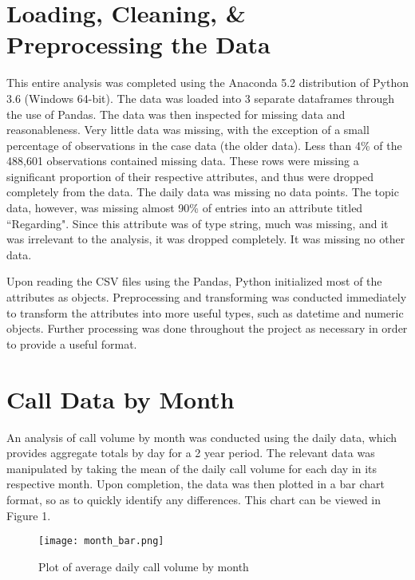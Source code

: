 \documentclass[11pt,twocolumn]{article}
\begin{document}
\section{Loading, Cleaning, \& Preprocessing the Data}
This entire analysis was completed using the Anaconda 5.2 distribution of Python 3.6 (Windows 64-bit).  The data was loaded into 3 separate dataframes through the use of Pandas.  The data was then inspected for missing data and reasonableness.  Very little data was missing, with the exception of a small percentage of observations in the case data (the older data).  Less than 4\% of the 488,601 observations contained missing data.  These rows were missing a significant proportion of their respective attributes, and thus were dropped completely from the data.  The daily data was missing no data points.  The topic data, however, was missing almost 90\% of entries into an attribute titled ``Regarding".  Since this attribute was of type string, much was missing, and it was irrelevant to the analysis, it was dropped completely.  It was missing no other data.
\par
Upon reading the CSV files using the Pandas, Python initialized most of the attributes as objects.  Preprocessing and transforming was conducted immediately to transform the attributes into more useful types, such as datetime and numeric objects.  Further processing was done throughout the project as necessary in order to provide a useful format.

\section{Call Data by Month}
An analysis of call volume by month was conducted using the daily data, which provides aggregate totals by day for a 2 year period. The relevant data was manipulated by taking the mean of the daily call volume for each day in its respective month.  Upon completion, the data was then plotted in a bar chart format, so as to quickly identify any differences.  This chart can be viewed in Figure 1.

\begin{figure}[h]
  \texttt{[image: month\_bar.png]}
  \caption{Plot of average daily call volume by month}
\end{figure}
\end{document}
